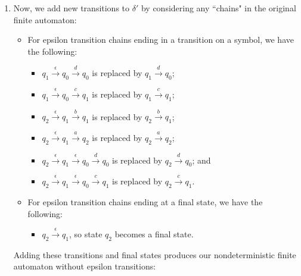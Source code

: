 \begin{example}
\begin{enumerate}
\begin{center}
\end{center}
\item Now, we add new transitions to $\delta'$ by considering any ``chains" in the original finite automaton:
	\begin{itemize}
	\item For epsilon transition chains ending in a transition on a symbol, we have the following:
		\begin{itemize}
		\item $q_{1} \xrightarrow{\epsilon} q_{0} \xrightarrow{d} q_{0}$ is replaced by $q_{1} \xrightarrow{d} q_{0}$;
		\item $q_{1} \xrightarrow{\epsilon} q_{0} \xrightarrow{c} q_{1}$ is replaced by $q_{1} \xrightarrow{c} q_{1}$;
		\item $q_{2} \xrightarrow{\epsilon} q_{1} \xrightarrow{b} q_{1}$ is replaced by $q_{2} \xrightarrow{b} q_{1}$;
		\item $q_{2} \xrightarrow{\epsilon} q_{1} \xrightarrow{a} q_{2}$ is replaced by $q_{2} \xrightarrow{a} q_{2}$;
		\item $q_{2} \xrightarrow{\epsilon} q_{1} \xrightarrow{\epsilon} q_{0} \xrightarrow{d} q_{0}$ is replaced by $q_{2} \xrightarrow{d} q_{0}$; and
		\item $q_{2} \xrightarrow{\epsilon} q_{1} \xrightarrow{\epsilon} q_{0} \xrightarrow{c} q_{1}$ is replaced by $q_{2} \xrightarrow{c} q_{1}$.
		\end{itemize}
	\item For epsilon transition chains ending at a final state, we have the following:
		\begin{itemize}
		\item $q_{2} \xrightarrow{\epsilon} q_{1}$, so state $q_{2}$ becomes a final state.
		\end{itemize}
	\end{itemize}
Adding these transitions and final states produces our nondeterministic finite automaton without epsilon transitions:
\begin{center}
\end{center}
\end{enumerate}
\end{example}
